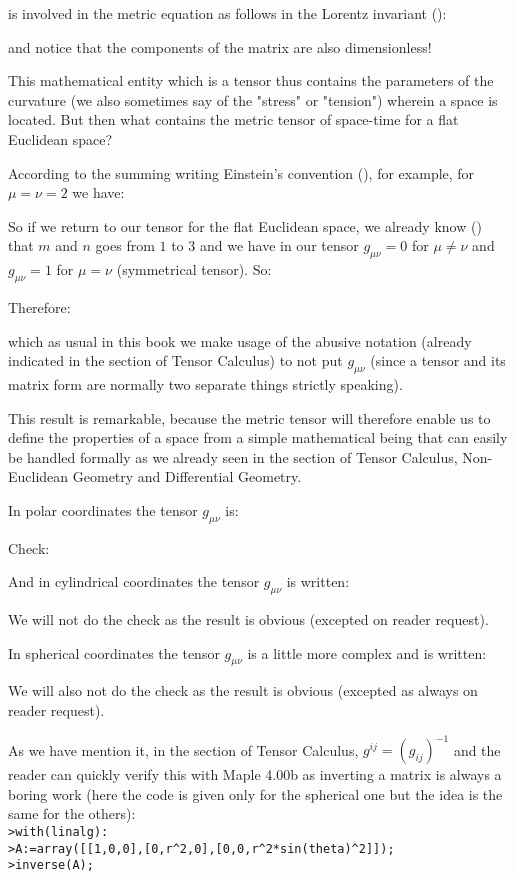 	is involved in the metric equation as follows in the Lorentz invariant ():
	
	and notice that the components of the matrix are also dimensionless!
	
	This mathematical entity which is a tensor thus contains the parameters of the curvature (we also sometimes say of the "stress" or "tension") wherein a space is located. But then what contains the metric tensor of space-time for a flat Euclidean space?
	
	According to the summing writing Einstein's convention (), for example, for $\mu=\nu=2$ we have:
	
	\label{metric flat space}So if we return to our tensor for the flat Euclidean space, we already know () that $m$ and $n$ goes from $1$ to $3$ and we have in our tensor $g_{\mu\nu}=0$ for $\mu\neq \nu$ and $g_{\mu\nu}=1$ for  $\mu= \nu$ (symmetrical tensor). So:
	
	Therefore:
	
	which as usual in this book we make usage of the abusive notation (already indicated in the section of Tensor Calculus) to not put $g_{\mu\nu}$ (since a tensor and its matrix form are normally two separate things strictly speaking).

	This result is remarkable, because the metric tensor will therefore enable us to define the properties of a space from a simple mathematical being that can easily be handled formally as we already seen in the section of Tensor Calculus, Non-Euclidean Geometry and Differential Geometry.

	In polar coordinates the tensor $g_{\mu\nu}$ is:
	
	Check:
	
	And in cylindrical coordinates the tensor $g_{\mu\nu}$ is written:
	
	We will not do the check as the result is obvious (excepted on reader request).
	
	\label{metric spherical space}In spherical coordinates the tensor $g_{\mu\nu}$ is a little more complex and is written:
	
	We will also not do the check as the result is obvious (excepted as always on reader request). 
	\begin{tcolorbox}[title=Remark,colframe=black,arc=10pt]
	As we have mention it, in the section of Tensor Calculus, $g^{ij}=(g_{ij})^{-1}$ and the reader can quickly verify this with Maple 4.00b as inverting a matrix is always a boring work (here the code is given only for the spherical one but the idea is the same for the others):\\
	
	\texttt{>with(linalg):\\
	>A:=array([[1,0,0],[0,r\string^2,0],[0,0,r\string^2*sin(theta)\string^2]]);\\
	>inverse(A);}
	\end{tcolorbox}
	
